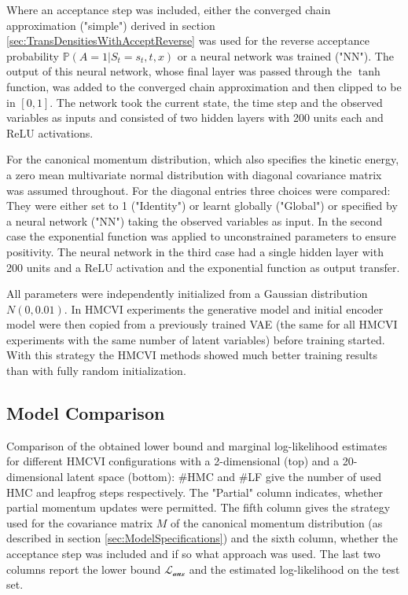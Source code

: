 Where an acceptance step was included, either the converged chain approximation ("simple") derived in section \ref{sec:TransDensitiesWithAcceptReverse} was used for the reverse acceptance probability $\mathbb{P}(A = 1|S_t = s_t, t, x)$ or a neural network was trained ("NN"). The output of this neural network, whose final layer was passed through the $\tanh$ function, was added to the converged chain approximation and then clipped to be in $[0, 1]$. The network took the current state, the time step and the observed variables as inputs and consisted of two hidden layers with 200 units each and ReLU activations.

For the canonical momentum distribution, which also specifies the kinetic energy, a zero mean multivariate normal distribution with diagonal covariance matrix was assumed throughout. For the diagonal entries three choices were compared: They were either set to 1 ("Identity") or learnt globally ("Global") or specified by a neural network ("NN") taking the observed variables as input. In the second case the exponential function was applied to unconstrained parameters to ensure positivity. The neural network in the third case had a single hidden layer with 200 units and a ReLU activation and the exponential function as output transfer.

All parameters were independently initialized from a Gaussian distribution $N(0, 0.01)$. In HMCVI experiments the generative model and initial encoder model were then copied from a previously trained VAE (the same for all HMCVI experiments with the same number of latent variables) before training started. With this strategy the HMCVI methods showed much better training results than with fully random initialization.

\subsection{Model Comparison}

\begin{table}[ht]
\centering

\caption{Comparison of the obtained lower bound and marginal log-likelihood estimates for different HMCVI configurations with a 2-dimensional (top) and a 20-dimensional latent space (bottom): \#HMC and \#LF give the number of used HMC and leapfrog steps respectively. The "Partial" column indicates, whether partial momentum updates were permitted. The fifth column gives the strategy used for the covariance matrix $M$ of the canonical momentum distribution (as described in section \ref{sec:ModelSpecifications}) and the sixth column, whether the acceptance step was included and if so what approach was used. The last two columns report the lower bound $\mathcal{L_\textrm{aux}}$ and the estimated log-likelihood on the test set.}
\label{tab:Results}
\end{table}

